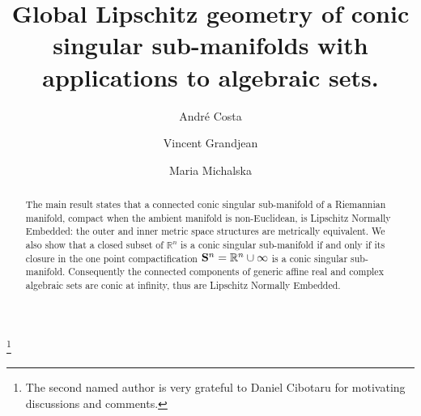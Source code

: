 \documentclass[11pt]{amsart}
\newcommand{\field}[1]{\mathbb{#1}}
\newcommand{\R}{\field{R}}
\newcommand{\bS}{{\bf S}}
\newcommand{\Rn}{{\R^n}}
\numberwithin{equation}{section}
\numberwithin{equation}{section}
\begin{document}
\title[conic singular sub-manifolds and algebraic sets]{Global Lipschitz geometry 
of conic singular sub-manifolds with applications to algebraic sets.}

\author[A. Costa]{Andr\'e Costa}
\thanks{The second named author is very grateful to Daniel Cibotaru for 
motivating discussions and comments.}
%
\author[V. Grandjean]{Vincent Grandjean}

\author[M. Michalska]{Maria Michalska}
\address{
A. Costa, 
Centro de Ci\^encias e tecnologias, 
Universidade Estadual do Cear\'a, 
Campus do Itaperi, 60.714-903 Fortaleza - CE, Brasil}
%
\address{V. Grandjean, 
Departamento de Matem\'atica, Departamento de Matem\'atica,
Universidade Federal de Santa Catarina, 
88.040-900 Florianópolis - SC, Brasil,
Brasil}
%
%
\address{M. Michalska, Wydzia\l{} Matematyki i Informatyki, Uniwersytet 
\L{}\'o{}dzki, Banacha 22, 90-238 \L{}\'o{}d\'z{}, Poland}


\subjclass[2000]{}




\begin{abstract}
The main result states that a connected conic singular sub-manifold 
of a Riemannian manifold, compact when the ambient manifold is non-Euclidean, 
is Lipschitz Normally Embedded: the outer and inner metric space structures are 
metrically equivalent. We also show that a closed subset of $\Rn$
is a
conic singular sub-manifold if and only if its closure in the one point 
compactification $\bS^n =\Rn\cup \infty$ is a conic singular
sub-manifold. Consequently the connected components of generic
affine real and complex algebraic sets are conic at infinity, thus are 
Lipschitz Normally Embedded. 
\end{abstract}
\end{document}
